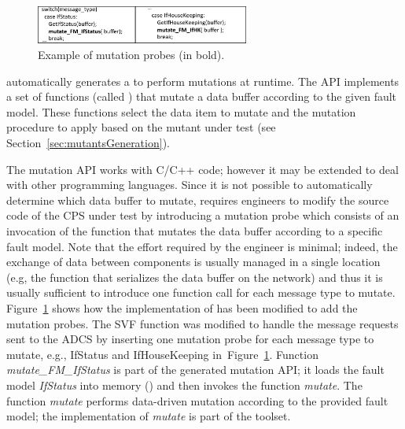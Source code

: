 \begin{figure}[tb]
\centering
\includegraphics[width=7cm]{damat/images/ProbesExample}
\caption{Example of \APPR mutation probes (in bold).}
\label{fig:appr:ProbesExample}
\end{figure}

\APPR automatically generates a  to perform mutations at runtime. The API implements a set of functions (called ) that mutate a data buffer according to the given fault model.
These functions select the data item to mutate and the mutation procedure to apply based on the mutant under test (see Section~\ref{sec:mutantsGeneration}).

The \APPR mutation API works with C/C++ code; however it may be extended to deal with other programming languages.
Since it is not possible to automatically determine which data buffer to mutate, \APPR requires engineers to modify the source code of the CPS under test by introducing a mutation probe which consists of an invocation of the \APPR function that mutates the data buffer according to a specific fault model.
Note that the effort required by the engineer is minimal; indeed, the exchange of data between components is usually managed in a single location (e.g, the function that serializes the data buffer on the network) and thus it is usually sufficient to introduce one function call for each message type to mutate.
Figure~\ref{fig:appr:ProbesExample} shows how the implementation of \ESAIL has been modified to add the mutation probes.
The SVF function was modified to handle the message requests sent to the ADCS by inserting one mutation probe for each message type to mutate, e.g., IfStatus and IfHouseKeeping in~Figure~\ref{fig:appr:ProbesExample}.
Function \emph{mutate\_FM\_IfStatus} is part of the generated mutation API; it loads the fault model \emph{IfStatus} into memory () and then invokes the function \emph{mutate}. The function \emph{mutate} performs data-driven mutation according to the provided fault model; the implementation of \emph{mutate} is part of the \APPR toolset.





